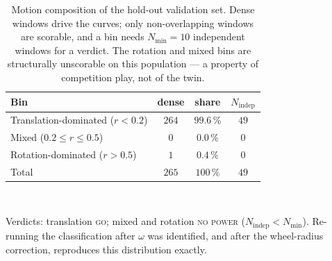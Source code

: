 \begin{table}[t]
  \caption{Motion composition of the hold-out validation set. Dense windows
  drive the curves; only non-overlapping windows are scorable, and a bin needs
  $N_{\min}=10$ independent windows for a verdict. The rotation and mixed bins
  are structurally unscorable on this population --- a property of competition
  play, not of the twin.}
  \label{tab:valcomp}
  \centering
  \begin{tabular}{lccc}
    \toprule
    Bin & dense & share & $N_{\mathrm{indep}}$ \\
    \midrule
    Translation-dominated ($r<0.2$)   & $264$ & $99.6\,\%$ & $49$ \\
    Mixed ($0.2\le r\le 0.5$)         & $0$   & $0.0\,\%$  & $0$ \\
    Rotation-dominated ($r>0.5$)      & $1$   & $0.4\,\%$  & $0$ \\
    \midrule
    Total                             & $265$ & $100\,\%$  & $49$ \\
    \bottomrule
  \end{tabular}
  \\[2pt]
  \raggedright\footnotesize Verdicts: translation \textsc{go}; mixed and
  rotation \textsc{no power} ($N_{\mathrm{indep}}<N_{\min}$). Re-running the
  classification after $\omega$ was identified, and after the wheel-radius
  correction, reproduces this distribution exactly.
\end{table}
